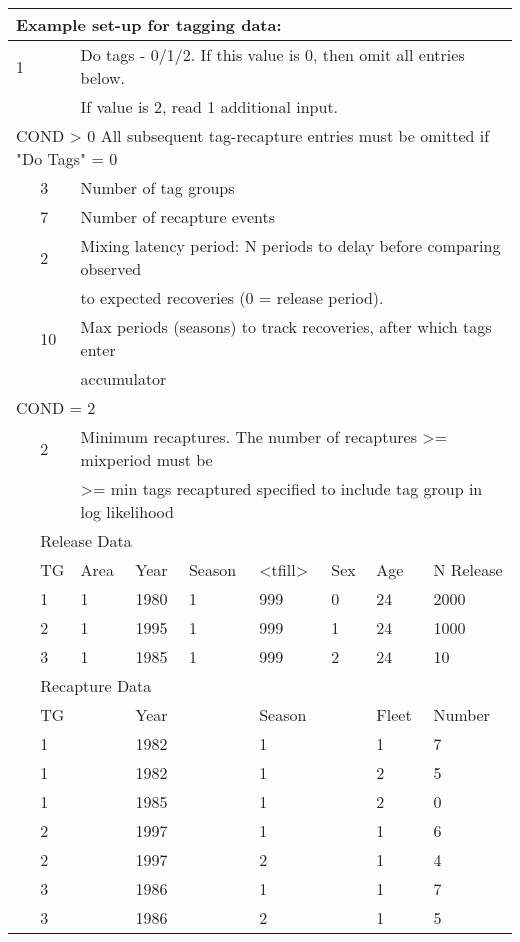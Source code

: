 \begin{center}
	\begin{tabular}{p{1.1cm} p{1.1cm} p{1.1cm} p{1.1cm} p{1.1cm} p{1.1cm} p{1.1cm} p{1.1cm} p{3cm}}
		\multicolumn{9}{l}{Example set-up for tagging data:}\\
		\hline
		1 & & \multicolumn{7}{l}{Do tags - 0/1/2. If this value is 0, then omit all entries below.}\\
		&   & \multicolumn{7}{l}{If value is 2, read 1 additional input.}\Tstrut\Bstrut\\
		\hline
		\multicolumn{9}{l}{COND > 0 All subsequent tag-recapture entries must be omitted if "Do Tags" = 0}
		 \Tstrut\\

		 & 3 & \multicolumn{7}{l}{Number of tag groups}\Bstrut\\
		 \hline
		 & 7 & \multicolumn{7}{l}{Number of recapture events}\Tstrut\Bstrut\\
		 \hline
		 & 2 & \multicolumn{7}{l}{Mixing latency period: N periods to delay before comparing observed}\Tstrut\\
		 &   &  \multicolumn{7}{l}{to expected recoveries (0 = release period). }\Bstrut\\
		 \hline
		 & 10 & \multicolumn{7}{l}{Max periods (seasons) to track recoveries, after which tags enter}\Tstrut\\
		 &    & \multicolumn{7}{l}{ accumulator}\Bstrut\\
		 \hline
		 \multicolumn{9}{l}{COND = 2} \Tstrut\\
		 &  2 &  \multicolumn{7}{l}{Minimum recaptures. The number of recaptures >= mixperiod must be}\\
		 &    &  \multicolumn{7}{l}{>= min tags recaptured specified to include tag group in log likelihood}\Bstrut\\
		 
		 \hline
		 & \multicolumn{8}{l}{Release Data} \Tstrut\\
		 & TG & Area & Year & Season & <tfill> & Sex & Age & N Release\Bstrut\\ 
		 \hline
		 & 1 & 1 & 1980 & 1 & 999 & 0 & 24 & 2000 \Tstrut\\
		 & 2 & 1 & 1995 & 1 & 999 & 1 & 24 & 1000 \\
		 & 3 & 1 & 1985 & 1 & 999 & 2 & 24 & 10 \Bstrut\\
		 \hline
		 & \multicolumn{8}{l}{Recapture Data}\Tstrut\\
		 & TG &  & Year&  & Season &  & Fleet  & Number\Bstrut\\ 
		 \hline
		 & 1 & & 1982 & & 1 & & 1 & 7 \Tstrut\\
		 & 1 & & 1982 & & 1 & & 2 & 5 \\
		 & 1 & & 1985 & & 1 & & 2 & 0 \\
		 & 2 & & 1997 & & 1 & & 1 & 6 \\
		 & 2 & & 1997 & & 2 & & 1 & 4 \\
		 & 3 & & 1986 & & 1 & & 1 & 7 \\
		 & 3 & & 1986 & & 2 & & 1 & 5 \Bstrut\\
		 \hline
	\end{tabular}
\end{center}

